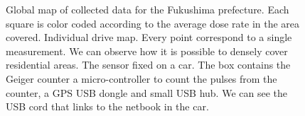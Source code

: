 \documentclass[11pt]{article}
\begin{document}
\begin{figure}[ht]
\centering
{}
  \caption[The Figure]{ 
             Global map of collected data for the Fukushima
            prefecture.  Each square is color coded according to the average
            dose rate in the area covered.
             Individual drive map. Every point correspond to a
            single measurement. We can observe how it is possible to densely
            cover residential areas.
             The sensor fixed on a car. The box contains the
            Geiger counter a micro-controller to count the pulses from the
            counter, a GPS USB dongle and small USB hub. We can see the USB
            cord that links to the netbook in the car.  
  }
\label{fig:thefigure}
\end{figure}



\end{document}
